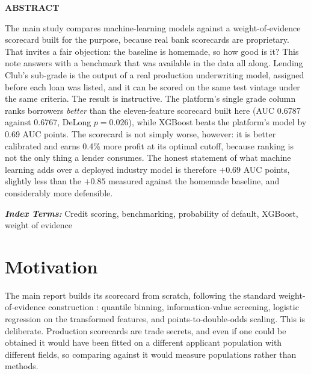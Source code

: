 \documentclass[a4paper,twocolumn,10pt]{article}
\begin{document}

\begin{center}\textbf{ABSTRACT}\end{center}
\noindent
The main study compares machine-learning models against a weight-of-evidence scorecard built for the purpose, because real bank scorecards are proprietary. That invites a fair objection: the baseline is homemade, so how good is it? This note answers with a benchmark that was available in the data all along. Lending Club's sub-grade is the output of a real production underwriting model, assigned before each loan was listed, and it can be scored on the same test vintage under the same criteria. The result is instructive. The platform's single grade column ranks borrowers \emph{better} than the eleven-feature scorecard built here (AUC 0.6787 against 0.6767, DeLong $p=0.026$), while XGBoost beats the platform's model by 0.69 AUC points. The scorecard is not simply worse, however: it is better calibrated and earns 0.4\% more profit at its optimal cutoff, because ranking is not the only thing a lender consumes. The honest statement of what machine learning adds over a deployed industry model is therefore $+0.69$ AUC points, slightly less than the $+0.85$ measured against the homemade baseline, and considerably more defensible.

\vspace{2mm}
\noindent\textbf{\textit{Index Terms:}} Credit scoring, benchmarking, probability of default, XGBoost, weight of evidence

\section{Motivation}

The main report builds its scorecard from scratch, following the standard weight-of-evidence construction \cite{siddiqi2006}: quantile binning, information-value screening, logistic regression on the transformed features, and points-to-double-odds scaling. This is deliberate. Production scorecards are trade secrets, and even if one could be obtained it would have been fitted on a different applicant population with different fields, so comparing against it would measure populations rather than methods.
\end{document}
